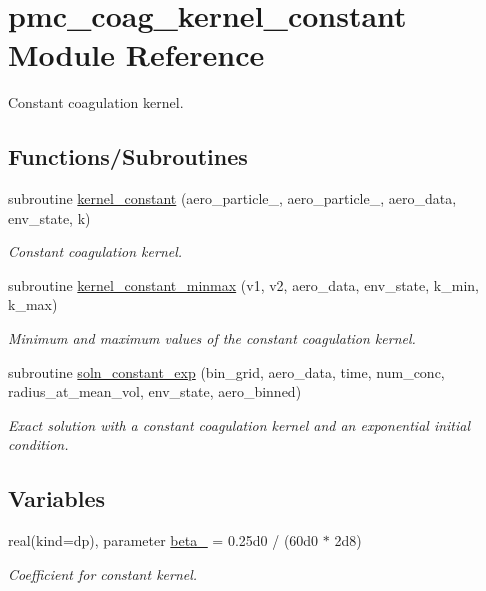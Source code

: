 \hypertarget{namespacepmc__coag__kernel__constant}{}\section{pmc\+\_\+coag\+\_\+kernel\+\_\+constant Module Reference}
\label{namespacepmc__coag__kernel__constant}


Constant coagulation kernel.  


\subsection*{Functions/\+Subroutines}
\begin{DoxyCompactItemize}
\item 
subroutine \mbox{\hyperlink{namespacepmc__coag__kernel__constant_ab7d28977bf4b5b1a3a7bdd716c496679}{kernel\+\_\+constant}} (aero\+\_\+particle\+\_, aero\+\_\+particle\+\_, aero\+\_\+data, env\+\_\+state, k)
\begin{DoxyCompactList}\small\item\em Constant coagulation kernel. \end{DoxyCompactList}\item 
subroutine \mbox{\hyperlink{namespacepmc__coag__kernel__constant_a1ebc8d04a6618fad647e4dcd9c21bb6a}{kernel\+\_\+constant\+\_\+minmax}} (v1, v2, aero\+\_\+data, env\+\_\+state, k\+\_\+min, k\+\_\+max)
\begin{DoxyCompactList}\small\item\em Minimum and maximum values of the constant coagulation kernel. \end{DoxyCompactList}\item 
subroutine \mbox{\hyperlink{namespacepmc__coag__kernel__constant_a9b2f8e22413812fde935ce8afaca32d9}{soln\+\_\+constant\+\_\+exp}} (bin\+\_\+grid, aero\+\_\+data, time, num\+\_\+conc, radius\+\_\+at\+\_\+mean\+\_\+vol, env\+\_\+state, aero\+\_\+binned)
\begin{DoxyCompactList}\small\item\em Exact solution with a constant coagulation kernel and an exponential initial condition. \end{DoxyCompactList}\end{DoxyCompactItemize}
\subsection*{Variables}
\begin{DoxyCompactItemize}
\item 
real(kind=dp), parameter \mbox{\hyperlink{namespacepmc__coag__kernel__constant_a26b296df0f2d1dd4d6f3f848b371b408}{beta\+\_}} = 0.\+25d0 / (60d0 $\ast$ 2d8)
\begin{DoxyCompactList}\small\item\em Coefficient for constant kernel. \end{DoxyCompactList}\end{DoxyCompactItemize}


